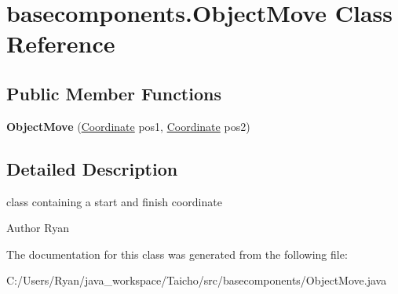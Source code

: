 \hypertarget{classbasecomponents_1_1_object_move}{\section{basecomponents.\-Object\-Move Class Reference}
\label{classbasecomponents_1_1_object_move}
}
\subsection*{Public Member Functions}
\begin{DoxyCompactItemize}
\item 
\hypertarget{classbasecomponents_1_1_object_move_a59fa15dce87f0b39d0b9b0ddd59ba026}{{\bfseries Object\-Move} (\hyperlink{classbasecomponents_1_1_coordinate}{Coordinate} pos1, \hyperlink{classbasecomponents_1_1_coordinate}{Coordinate} pos2)}\label{classbasecomponents_1_1_object_move_a59fa15dce87f0b39d0b9b0ddd59ba026}

\end{DoxyCompactItemize}


\subsection{Detailed Description}
class containing a start and finish coordinate \begin{DoxyAuthor}{Author}
Ryan 
\end{DoxyAuthor}


The documentation for this class was generated from the following file\-:\begin{DoxyCompactItemize}
\item 
C\-:/\-Users/\-Ryan/java\-\_\-workspace/\-Taicho/src/basecomponents/Object\-Move.\-java\end{DoxyCompactItemize}
